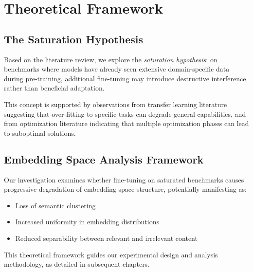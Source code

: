 \section{Theoretical Framework}

\subsection{The Saturation Hypothesis}

Based on the literature review, we explore the \textit{saturation hypothesis}: on benchmarks where models have already seen extensive domain-specific data during pre-training, additional fine-tuning may introduce destructive interference rather than beneficial adaptation.

This concept is supported by observations from transfer learning literature suggesting that over-fitting to specific tasks can degrade general capabilities, and from optimization literature indicating that multiple optimization phases can lead to suboptimal solutions.

\subsection{Embedding Space Analysis Framework}

Our investigation examines whether fine-tuning on saturated benchmarks causes progressive degradation of embedding space structure, potentially manifesting as:

\begin{itemize}
\item Loss of semantic clustering
\item Increased uniformity in embedding distributions
\item Reduced separability between relevant and irrelevant content
\end{itemize}

This theoretical framework guides our experimental design and analysis methodology, as detailed in subsequent chapters.
